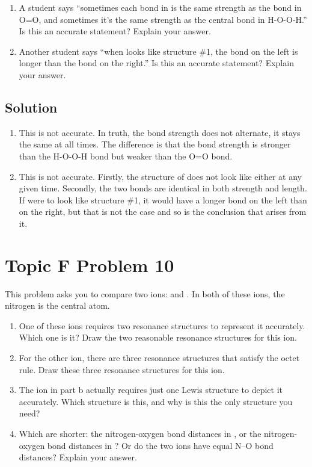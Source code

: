 \documentclass[10pt]{article}
\begin{document}
        \begin{enumerate}[label=\alph*)]
            \item   A student says “sometimes each bond in  is the same strength as the bond in O=O, and sometimes it's the same strength as the central bond in H-O-O-H.” 
                Is this an accurate statement? 
                Explain your answer.
            \item   Another student says “when  looks like structure \#1, the bond on the left is longer than the bond on the right.” 
                Is this an accurate statement? 
                Explain your answer.
        \end{enumerate}
        
        \subsection{Solution}
            \begin{enumerate}[label=\alph*/]
                \item   This is not accurate. In truth, the bond strength does not alternate, it stays the same at all times. The difference is that the bond strength is stronger than the H-O-O-H bond but weaker than the O=O bond.
                \item   This is not accurate. Firstly, the structure of  does not look like either at any given time. Secondly, the two bonds are identical in both strength and length. If  were to look like structure \#1, it would have a longer bond on the left than on the right, but that is not the case and so is the conclusion that arises from it.
            \end{enumerate}


    \pagebreak
    \section{Topic F Problem 10}
        This problem asks you to compare two ions:  and . 
        In both of these ions, the nitrogen is the central atom.
        \begin{enumerate}[label=\alph*)]
            \item   One of these ions requires two resonance structures to represent it accurately. Which one is it? Draw the two reasonable resonance structures for this ion.
            \item   For the other ion, there are three resonance structures that satisfy the octet rule. Draw these three resonance structures for this ion.
            \item   The ion in part b actually requires just one Lewis structure to depict it accurately. Which structure is this, and why is this the only structure you need?
            \item   Which are shorter: the nitrogen-oxygen bond distances in , or the nitrogen-oxygen bond distances in ? Or do the two ions have equal N–O bond distances? Explain your answer.
        \end{enumerate}
        
\end{document}
